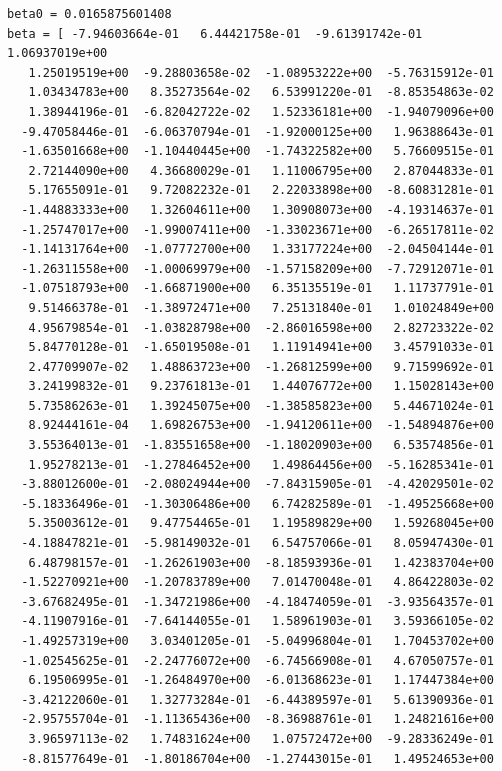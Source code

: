 \documentclass{article}
\begin{document}
\begin{lstlisting}
beta0 = 0.0165875601408
beta = [ -7.94603664e-01   6.44421758e-01  -9.61391742e-01   1.06937019e+00
   1.25019519e+00  -9.28803658e-02  -1.08953222e+00  -5.76315912e-01
   1.03434783e+00   8.35273564e-02   6.53991220e-01  -8.85354863e-02
   1.38944196e-01  -6.82042722e-02   1.52336181e+00  -1.94079096e+00
  -9.47058446e-01  -6.06370794e-01  -1.92000125e+00   1.96388643e-01
  -1.63501668e+00  -1.10440445e+00  -1.74322582e+00   5.76609515e-01
   2.72144090e+00   4.36680029e-01   1.11006795e+00   2.87044833e-01
   5.17655091e-01   9.72082232e-01   2.22033898e+00  -8.60831281e-01
  -1.44883333e+00   1.32604611e+00   1.30908073e+00  -4.19314637e-01
  -1.25747017e+00  -1.99007411e+00  -1.33023671e+00  -6.26517811e-02
  -1.14131764e+00  -1.07772700e+00   1.33177224e+00  -2.04504144e-01
  -1.26311558e+00  -1.00069979e+00  -1.57158209e+00  -7.72912071e-01
  -1.07518793e+00  -1.66871900e+00   6.35135519e-01   1.11737791e-01
   9.51466378e-01  -1.38972471e+00   7.25131840e-01   1.01024849e+00
   4.95679854e-01  -1.03828798e+00  -2.86016598e+00   2.82723322e-02
   5.84770128e-01  -1.65019508e-01   1.11914941e+00   3.45791033e-01
   2.47709907e-02   1.48863723e+00  -1.26812599e+00   9.71599692e-01
   3.24199832e-01   9.23761813e-01   1.44076772e+00   1.15028143e+00
   5.73586263e-01   1.39245075e+00  -1.38585823e+00   5.44671024e-01
   8.92444161e-04   1.69826753e+00  -1.94120611e+00  -1.54894876e+00
   3.55364013e-01  -1.83551658e+00  -1.18020903e+00   6.53574856e-01
   1.95278213e-01  -1.27846452e+00   1.49864456e+00  -5.16285341e-01
  -3.88012600e-01  -2.08024944e+00  -7.84315905e-01  -4.42029501e-02
  -5.18336496e-01  -1.30306486e+00   6.74282589e-01  -1.49525668e+00
   5.35003612e-01   9.47754465e-01   1.19589829e+00   1.59268045e+00
  -4.18847821e-01  -5.98149032e-01   6.54757066e-01   8.05947430e-01
   6.48798157e-01  -1.26261903e+00  -8.18593936e-01   1.42383704e+00
  -1.52270921e+00  -1.20783789e+00   7.01470048e-01   4.86422803e-02
  -3.67682495e-01  -1.34721986e+00  -4.18474059e-01  -3.93564357e-01
  -4.11907916e-01  -7.64144055e-01   1.58961903e-01   3.59366105e-02
  -1.49257319e+00   3.03401205e-01  -5.04996804e-01   1.70453702e+00
  -1.02545625e-01  -2.24776072e+00  -6.74566908e-01   4.67050757e-01
   6.19506995e-01  -1.26484970e+00  -6.01368623e-01   1.17447384e+00
  -3.42122060e-01   1.32773284e-01  -6.44389597e-01   5.61390936e-01
  -2.95755704e-01  -1.11365436e+00  -8.36988761e-01   1.24821616e+00
   3.96597113e-02   1.74831624e+00   1.07572472e+00  -9.28336249e-01
  -8.81577649e-01  -1.80186704e+00  -1.27443015e-01   1.49524653e+00

\end{lstlisting}
\end{document}
